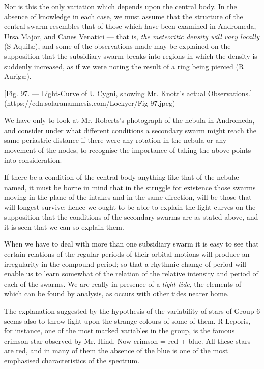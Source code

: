 \documentclass[a4paper, 12pt, oneside, polutonikogreek, english]{article}
\begin{document}
Nor is this the only variation which depends upon the central body. In the absence of knowledge in each case, we must assume that the structure of the central swarm resembles that of those which have been examined in Andromeda, Ursa Major, and Canes Venatici --- that is, \emph{the meteoritic density will vary locally} (S Aquilæ), and some of the observations made may be explained on the supposition that the subsidiary swarm breaks into regions in which the density is suddenly increased, as if we were noting the result of a ring being pierced (R Aurigæ).

[Fig. 97. --- Light-Curve of U Cygni, showing Mr. Knott's actual Observations.](https://cdn.solaranamnesis.com/Lockyer/Fig-97.jpeg)

We have only to look at Mr. Roberts's photograph of the nebula in Andromeda, and consider under what different conditions a secondary swarm might reach the same periastric distance if there were any rotation in the nebula or any movement of the nodes, to recognise the importance of taking the above points into consideration.

If there be a condition of the central body anything like that of the nebulæ named, it must be borne in mind that in the struggle for existence those swarms moving in the plane of the intakes and in the same direction, will be those that will longest survive; hence we ought to be able to explain the light-curves on the supposition that the conditions of the secondary swarms are as stated above, and it is seen that we can so explain them.

When we have to deal with more than one subsidiary swarm it is easy to see that certain relations of the regular periods of their orbital motions will produce an irregularity in the compound period; so that a rhythmic change of period will enable us to learn somewhat of the relation of the relative intensity and period of each of the swarms. We are really in presence of a \emph{light-tide}, the elements of which can be found by analysis, as occurs with other tides nearer home.

The explanation suggested by the hypothesis of the variability of stars of Group 6 seems also to throw light upon the strange colours of some of them. R Leporis, for instance, one of the most marked variables in the group, is the famous crimson star observed by Mr. Hind. Now crimson = red + blue. All these stars are red, and in many of them the absence of the blue is one of the most emphasised characteristics of the spectrum.
\end{document}
